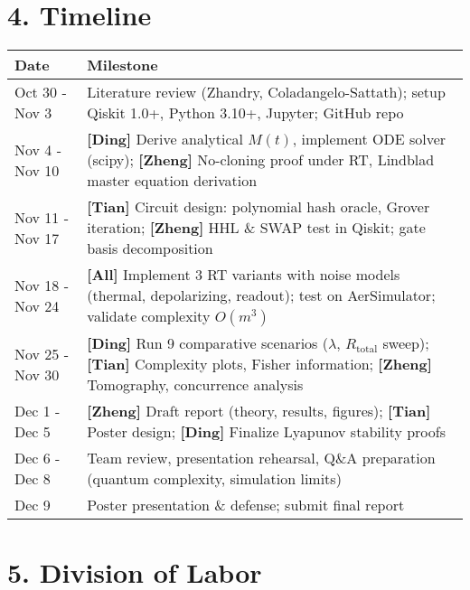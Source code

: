 \documentclass[a4paper,10pt,twoside]{article}
\begin{document}
\vspace{-4pt}
\section*{4. Timeline}
\vspace{-4pt}
\begin{center}
\begin{tabular}{|l|p{10.5cm}|}
\hline
\textbf{Date} & \textbf{Milestone} \\
\hline
Oct 30 - Nov 3 & Literature review (Zhandry, Coladangelo-Sattath); setup Qiskit 1.0+, Python 3.10+, Jupyter; GitHub repo \\
\hline
Nov 4 - Nov 10 & \textbf{[Ding]} Derive analytical $M(t)$, implement ODE solver (scipy); \textbf{[Zheng]} No-cloning proof under RT, Lindblad master equation derivation \\
\hline
Nov 11 - Nov 17 & \textbf{[Tian]} Circuit design: polynomial hash oracle, Grover iteration; \textbf{[Zheng]} HHL \& SWAP test in Qiskit; gate basis decomposition \\
\hline
Nov 18 - Nov 24 & \textbf{[All]} Implement 3 RT variants with noise models (thermal, depolarizing, readout); test on AerSimulator; validate complexity $O(m^3)$ \\
\hline
Nov 25 - Nov 30 & \textbf{[Ding]} Run 9 comparative scenarios ($\lambda$, $R_{\text{total}}$ sweep); \textbf{[Tian]} Complexity plots, Fisher information; \textbf{[Zheng]} Tomography, concurrence analysis \\
\hline
Dec 1 - Dec 5 & \textbf{[Zheng]} Draft report (theory, results, figures); \textbf{[Tian]} Poster design; \textbf{[Ding]} Finalize Lyapunov stability proofs \\
\hline
Dec 6 - Dec 8 & Team review, presentation rehearsal, Q\&A preparation (quantum complexity, simulation limits) \\
\hline
Dec 9 & Poster presentation \& defense; submit final report \\
\hline
\end{tabular}
\end{center}
\vspace{-4pt}
\section*{5. Division of Labor}
\vspace{-4pt}
\end{document}
